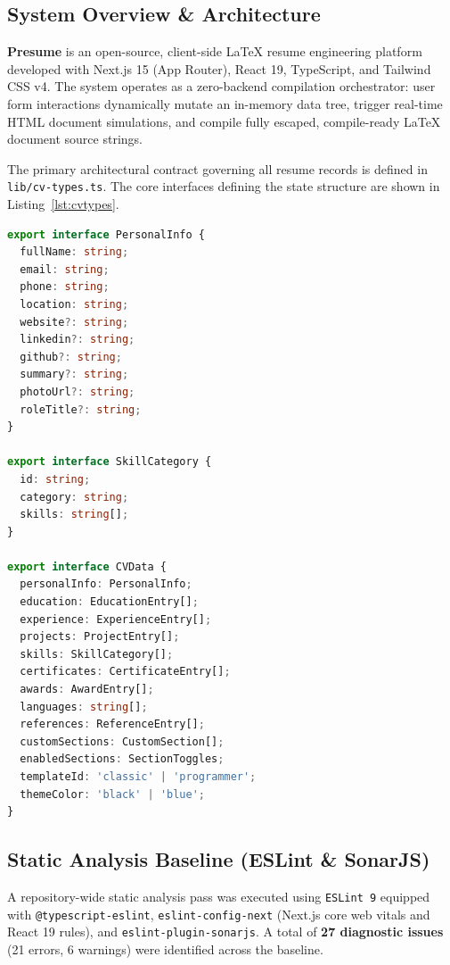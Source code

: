 \documentclass[12pt,a4paper]{article}
\begin{document}
\subsection{System Overview \& Architecture}
\textbf{Presume} is an open-source, client-side LaTeX resume engineering platform developed with Next.js 15 (App Router), React 19, TypeScript, and Tailwind CSS v4. The system operates as a zero-backend compilation orchestrator: user form interactions dynamically mutate an in-memory data tree, trigger real-time HTML document simulations, and compile fully escaped, compile-ready LaTeX document source strings.

The primary architectural contract governing all resume records is defined in \texttt{lib/cv-types.ts}. The core interfaces defining the state structure are shown in Listing~\ref{lst:cvtypes}.

\begin{lstlisting}[language=TypeScript, caption={Core Domain Model Definitions (\texttt{lib/cv-types.ts})}, label={lst:cvtypes}]
export interface PersonalInfo {
  fullName: string;
  email: string;
  phone: string;
  location: string;
  website?: string;
  linkedin?: string;
  github?: string;
  summary?: string;
  photoUrl?: string;
  roleTitle?: string;
}

export interface SkillCategory {
  id: string;
  category: string;
  skills: string[];
}

export interface CVData {
  personalInfo: PersonalInfo;
  education: EducationEntry[];
  experience: ExperienceEntry[];
  projects: ProjectEntry[];
  skills: SkillCategory[];
  certificates: CertificateEntry[];
  awards: AwardEntry[];
  languages: string[];
  references: ReferenceEntry[];
  customSections: CustomSection[];
  enabledSections: SectionToggles;
  templateId: 'classic' | 'programmer';
  themeColor: 'black' | 'blue';
}
\end{lstlisting}

\subsection{Static Analysis Baseline (ESLint \& SonarJS)}
A repository-wide static analysis pass was executed using \texttt{ESLint 9} equipped with \texttt{@typescript-eslint}, \texttt{eslint-config-next} (Next.js core web vitals and React 19 rules), and \texttt{eslint-plugin-sonarjs}. A total of \textbf{27 diagnostic issues} (21 errors, 6 warnings) were identified across the baseline.
\end{document}

